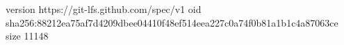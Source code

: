 version https://git-lfs.github.com/spec/v1
oid sha256:88212ea75af7d4209dbee04410f48ef514eea227c0a74f0b81a1b1c4a87063ce
size 11148
